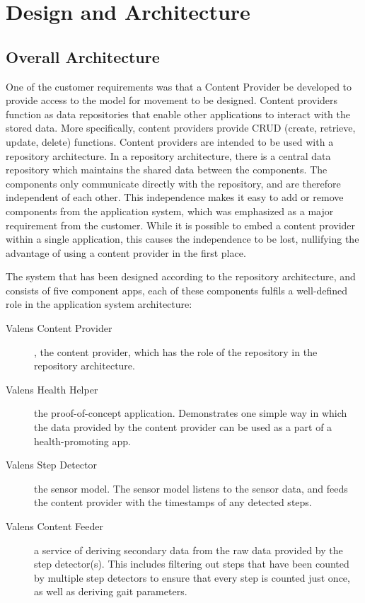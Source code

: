 \chapter{Design and Architecture}


\section{Overall Architecture}
One of the customer requirements was that a Content Provider be developed to provide access to the model for movement to be designed. Content providers function as data repositories that enable other applications to interact with the stored data. More specifically, content providers provide CRUD (create, retrieve, update, delete) functions. Content providers are intended to be used with a repository architecture. In a repository architecture, there is a central data repository which maintains the shared data between the components. The components only communicate directly with the repository, and are therefore independent of each other. This independence makes it easy to add or remove components from the application system, which was emphasized as a major requirement from the customer. While it is possible to embed a content provider within a single application, this causes the independence to be lost, nullifying the advantage of using a content provider in the first place.

The system that has been designed according to the repository architecture, and consists of five component apps, each of these components fulfils a well-defined role in the application system architecture:
\begin{description}
\item[Valens Content Provider], the content provider, which has the role of the repository in the repository architecture.
\item[Valens Health Helper] the proof-of-concept application. Demonstrates one simple way in which the data provided by the content provider can be used as a part of a health-promoting app.
\item[Valens Step Detector] the sensor model. The sensor model listens to the sensor data, and feeds the content provider with the timestamps of any detected steps.
\item[Valens Content Feeder] a service of deriving secondary data from the raw data provided by the step detector(s). This includes filtering out steps that have been counted by multiple step detectors to ensure that every step is counted just once, as well as deriving gait parameters.
\end{description}


